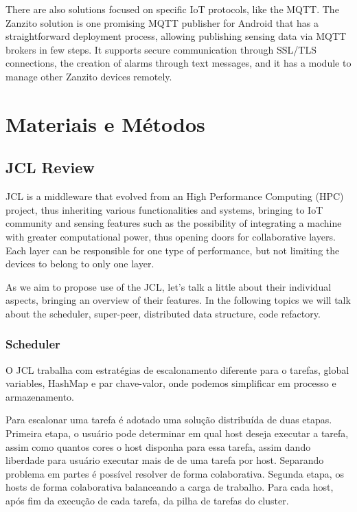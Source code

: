 \documentclass[12pt]{article}
\begin{document}
There are also solutions focused on specific IoT protocols, like the MQTT. The Zanzito solution is one promising
MQTT publisher for Android that has a straightforward deployment process, allowing publishing sensing data via MQTT
brokers in few steps. It supports secure communication through SSL/TLS connections, the creation of alarms through
text messages, and it has a module to manage other Zanzito devices remotely.

\section{Materiais e Métodos}
\subsection{JCL Review}
JCL is a middleware that evolved from an High Performance Computing (HPC) project, thus inheriting various functionalities and systems, bringing to IoT community and sensing features such as the possibility of integrating a machine with greater computational power, thus opening doors for collaborative layers. Each layer can be responsible for one type of performance, but not limiting the devices to belong to only one layer.

As we aim to propose use of the JCL, let's talk a little about their individual aspects, bringing an overview of their features. In the following topics we will talk about the scheduler, super-peer, distributed data structure, code refactory. 

\subsubsection{Scheduler}
O JCL trabalha com estratégias de escalonamento diferente para o tarefas, global variables, HashMap e par chave-valor, onde podemos simplificar em processo e armazenamento. 


Para escalonar uma tarefa é adotado uma solução distribuída de duas etapas. Primeira etapa, o usuário pode determinar em qual host deseja executar a tarefa, assim como quantos cores o host disponha para essa tarefa, assim dando liberdade para usuário executar mais de de uma tarefa por host. Separando problema em partes é possível resolver de forma colaborativa. Segunda etapa, os hosts de forma colaborativa balanceando a carga de trabalho. Para cada host, após fim da execução de cada tarefa, da pilha de tarefas do cluster.
\end{document}
